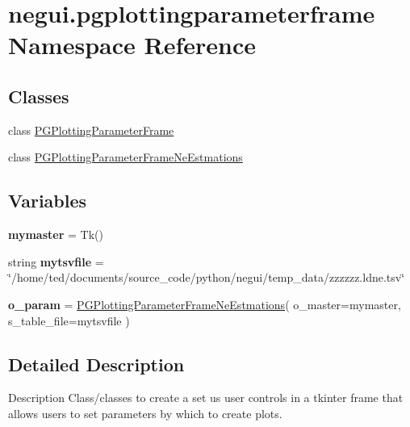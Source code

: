 \hypertarget{namespacenegui_1_1pgplottingparameterframe}{}\section{negui.\+pgplottingparameterframe Namespace Reference}
\label{namespacenegui_1_1pgplottingparameterframe}
\subsection*{Classes}
\begin{DoxyCompactItemize}
\item 
class \hyperlink{classnegui_1_1pgplottingparameterframe_1_1PGPlottingParameterFrame}{P\+G\+Plotting\+Parameter\+Frame}
\item 
class \hyperlink{classnegui_1_1pgplottingparameterframe_1_1PGPlottingParameterFrameNeEstmations}{P\+G\+Plotting\+Parameter\+Frame\+Ne\+Estmations}
\end{DoxyCompactItemize}
\subsection*{Variables}
\begin{DoxyCompactItemize}
\item 
{\bfseries mymaster} = Tk()\hypertarget{namespacenegui_1_1pgplottingparameterframe_aad22fc8d0d588bf3f1657853d46e3959}{}\label{namespacenegui_1_1pgplottingparameterframe_aad22fc8d0d588bf3f1657853d46e3959}

\item 
string {\bfseries mytsvfile} = \char`\"{}/home/ted/documents/source\+\_\+code/python/negui/temp\+\_\+data/zzzzzz.\+ldne.\+tsv\char`\"{}\hypertarget{namespacenegui_1_1pgplottingparameterframe_a4f03f34986d3ce39e3cdb06a6a482b9c}{}\label{namespacenegui_1_1pgplottingparameterframe_a4f03f34986d3ce39e3cdb06a6a482b9c}

\item 
{\bfseries o\+\_\+param} = \hyperlink{classnegui_1_1pgplottingparameterframe_1_1PGPlottingParameterFrameNeEstmations}{P\+G\+Plotting\+Parameter\+Frame\+Ne\+Estmations}( o\+\_\+master=mymaster, s\+\_\+table\+\_\+file=mytsvfile )\hypertarget{namespacenegui_1_1pgplottingparameterframe_ac5abc34a37aa1de566a81ab7571f602a}{}\label{namespacenegui_1_1pgplottingparameterframe_ac5abc34a37aa1de566a81ab7571f602a}

\end{DoxyCompactItemize}


\subsection{Detailed Description}
\begin{DoxyVerb}Description
Class/classes to create a set us user controls in a 
tkinter frame that allows users to set parameters by 
which to create plots.  
\end{DoxyVerb}
 